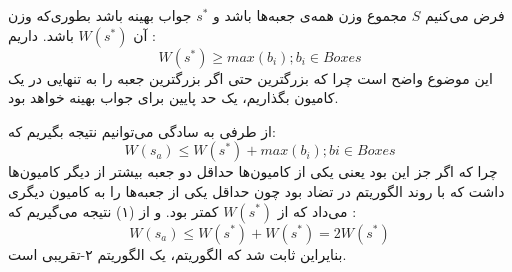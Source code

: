 \documentclass[]{article}
\begin{document}
فرض می‌کنیم $S$ مجموع وزن همه‌ی جعبه‌ها باشد و
$s^*$ جواب بهینه باشد بطوری‌که وزن آن $W(s^*)$ باشد.
داریم :
\begin{equation}
    W(s^*) \ge max(b_i); b_i \in Boxes
\end{equation}
این موضوع واضح است چرا که بزرگترین حتی اگر بزرگترین جعبه را به تنهایی در یک
کامیون بگذاریم، یک حد پایین برای جواب بهینه خواهد بود.

از طرفی به سادگی می‌توانیم نتیجه بگیریم که:
\begin{equation}
    W(s_a) \le W(s^*) + max(b_i) ; bi \in Boxes
\end{equation}
چرا که اگر جز این بود یعنی یکی از کامیون‌ها حداقل دو جعبه بیشتر از دیگر کامیون‌ها داشت
که با روند الگوریتم در تضاد بود چون حداقل یکی از جعبه‌ها را به کامیون دیگری می‌داد که از 
$W(s^*)$ کمتر بود.
و از (۱) نتیجه می‌گیریم که :
\begin{equation}
    W(s_a) \le W(s^*) + W(s^*) = 2 W(s^*)
\end{equation}
بنایراین ثابت شد که الگوریتم، یک الگوریتم ۲-تقریبی است.
\end{document}
